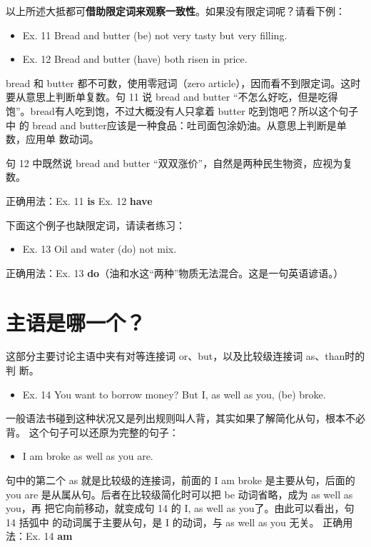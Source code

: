 \documentclass{yufa}
\begin{document}
以上所述大抵都可\textbf{借助限定词来观察一致性}。如果没有限定词呢？请看下例：
\begin{mybox}
  \begin{itemize}
  \item   Ex. 11 Bread and butter (be) not very tasty but very filling.
  \item   Ex. 12 Bread and butter (have) both risen in price.
  \end{itemize}

  bread 和 butter 都不可数，使用零冠词（zero article），因而看不到限定词。这时
  要从意思上判断单复数。句 11 说 bread and butter “不怎么好吃，但是吃得
  饱”。bread有人吃到饱，不过大概没有人只拿着 butter 吃到饱吧？所以这个句子中
  的 bread and butter应该是一种食品：吐司面包涂奶油。从意思上判断是单数，应用单
  数动词。

  句 12 中既然说 bread and butter “双双涨价”，自然是两种民生物资，应视为复
  数。

  \tcblower

  正确用法：Ex. 11 \textbf{is} \qquad\quad Ex. 12 \textbf{have}
\end{mybox}

下面这个例子也缺限定词，请读者练习：
\begin{mybox}
  \begin{itemize}
  \item   Ex. 13 Oil and water (do) not mix.
  \end{itemize}
  \tcblower
  正确用法：Ex. 13 \textbf{do}（油和水这“两种”物质无法混合。这是一句英语谚语。）
\end{mybox}

\section{主语是哪一个？}

这部分主要讨论主语中夹有对等连接词 or、but，以及比较级连接词 as、than时的判
断。
\begin{mybox}
  \begin{itemize}
  \item   Ex. 14 You want to borrow money? But I, as well as you, (be) broke.
  \end{itemize}
  一般语法书碰到这种状况又是列出规则叫人背，其实如果了解简化从句，根本不必背。
  这个句子可以还原为完整的句子：
  \begin{itemize}
  \item   I am broke as well as you are.
  \end{itemize}
  句中的第二个 as 就是比较级的连接词，前面的 I am broke 是主要从句，后面的you
  are 是从属从句。后者在比较级简化时可以把 be 动词省略，成为 as well as you，再
  把它向前移动，就变成句 14 的 I, as well as you了。由此可以看出，句 14 括弧中
  的动词属于主要从句，是 I 的动词，与 as well as you 无关。
  \tcblower
  正确用法：Ex. 14 \textbf{am}
\end{mybox}
\end{document}
